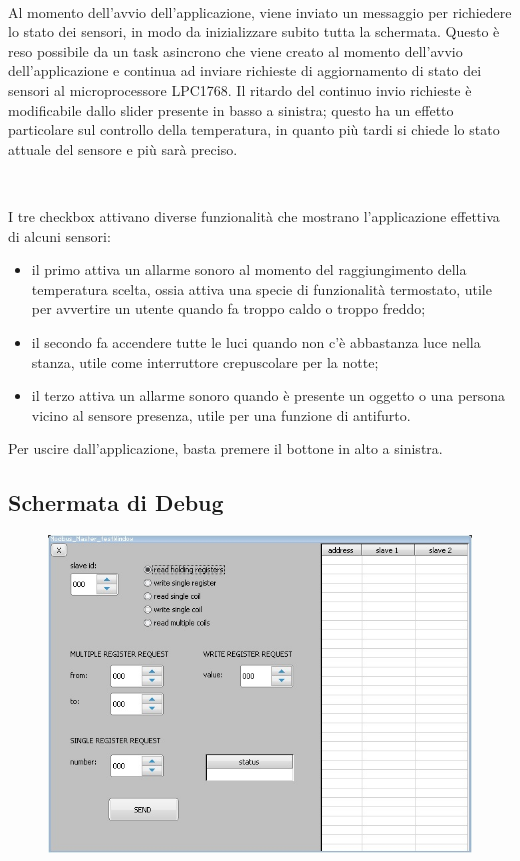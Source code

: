 \documentclass[a4paper,titlepage]{book}
\newcommand{\itema}{\begin{itemize}[noitemsep,topsep=10pt,parsep=5pt,partopsep=10pt]}
\begin{document}
~

Al momento dell'avvio dell'applicazione, viene inviato un messaggio per richiedere lo stato dei sensori, in modo da inizializzare subito tutta la schermata. Questo è reso possibile da un task asincrono che viene creato al momento dell'avvio dell'applicazione e continua ad inviare richieste di aggiornamento di stato dei sensori al microprocessore LPC1768. Il ritardo del continuo invio richieste è modificabile dallo slider presente in basso a sinistra; questo ha un effetto particolare sul controllo della temperatura, in quanto più tardi si chiede lo stato attuale del sensore e più sarà preciso.

~

I tre checkbox attivano diverse funzionalità che mostrano l'applicazione effettiva di alcuni sensori:

\itema

\item il primo attiva un allarme sonoro al momento del raggiungimento della temperatura scelta, ossia attiva una specie di funzionalità termostato, utile per avvertire un utente quando fa troppo caldo o troppo freddo;

\item il secondo fa accendere tutte le luci quando non c'è abbastanza luce nella stanza, utile come interruttore crepuscolare per la notte;

\item il terzo attiva un allarme sonoro quando è presente un oggetto o una persona vicino al sensore presenza, utile per una funzione di antifurto.

\end{itemize}

Per uscire dall'applicazione, basta premere il bottone in alto a sinistra.

\newpage
\subsection{Schermata di Debug}

\begin{figure}[!h]
\centering
\includegraphics[scale=0.6]{debug.jpg}
\end{figure}
\end{document}
